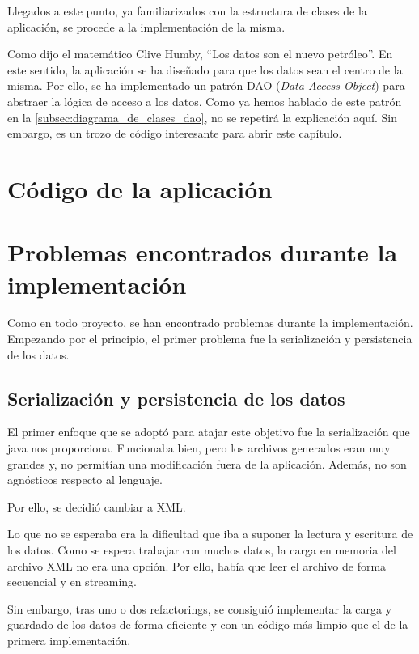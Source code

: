 Llegados a este punto, ya familiarizados con la estructura de clases de la aplicación, se procede a la implementación de la misma.

Como dijo el matemático Clive Humby, \enquote{Los datos son el nuevo petróleo}\autocite{talagala2022data}.
En este sentido, la aplicación se ha diseñado para que los datos sean el centro de la misma.
Por ello, se ha implementado un patrón DAO (\textit{Data Access Object}) para abstraer la lógica de acceso a los datos.
Como ya hemos hablado de este patrón en la \autoref{subsec:diagrama_de_clases_dao}, no se repetirá la explicación aquí.
Sin embargo, es un trozo de código interesante para abrir este capítulo.

\section{Código de la aplicación}\label{sec:codigo_de_la_aplicacion}


\section{Problemas encontrados durante la implementación}\label{sec:problemas_encontrados_during_la_implementacion}
Como en todo proyecto, se han encontrado problemas durante la implementación.
Empezando por el principio, el primer problema fue la serialización y persistencia de los datos.

\subsection{Serialización y persistencia de los datos}\label{subsec:serializacion_y_persistencia_de_los_datos}
El primer enfoque que se adoptó para atajar este objetivo fue la serialización que java nos proporciona.
Funcionaba bien, pero los archivos generados eran muy grandes y, no permitían una modificación fuera de la aplicación.
Además, no son agnósticos respecto al lenguaje.

Por ello, se decidió cambiar a XML\@.

Lo que no se esperaba era la dificultad que iba a suponer la lectura y escritura de los datos.
Como se espera trabajar con muchos datos, la carga en memoria del archivo XML no era una opción.
Por ello, había que leer el archivo de forma secuencial y en streaming.

Sin embargo, tras uno o dos refactorings, se consiguió implementar la carga y guardado de los datos de forma eficiente y
con un código más limpio que el de la primera implementación.

